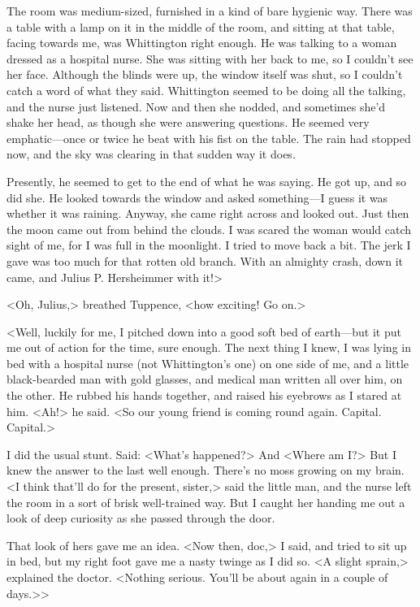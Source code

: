 The room was medium-sized, furnished in a kind of bare hygienic way. There was a table with a lamp on it in the middle of the room, and sitting at that table, facing towards me, was Whittington right enough. He was talking to a woman dressed as a hospital nurse. She was sitting with her back to me, so I couldn't see her face. Although the blinds were up, the window itself was shut, so I couldn't catch a word of what they said. Whittington seemed to be doing all the talking, and the nurse just listened. Now and then she nodded, and sometimes she'd shake her head, as though she were answering questions. He seemed very emphatic—once or twice he beat with his fist on the table. The rain had stopped now, and the sky was clearing in that sudden way it does.

Presently, he seemed to get to the end of what he was saying. He got up, and so did she. He looked towards the window and asked something—I guess it was whether it was raining. Anyway, she came right across and looked out. Just then the moon came out from behind the clouds. I was scared the woman would catch sight of me, for I was full in the moonlight. I tried to move back a bit. The jerk I gave was too much for that rotten old branch. With an almighty crash, down it came, and Julius P. Hersheimmer with it!>

<Oh, Julius,> breathed Tuppence, <how exciting! Go on.>

<Well, luckily for me, I pitched down into a good soft bed of earth—but it put me out of action for the time, sure enough. The next thing I knew, I was lying in bed with a hospital nurse (not Whittington's one) on one side of me, and a little black-bearded man with gold glasses, and medical man written all over him, on the other. He rubbed his hands together, and raised his eyebrows as I stared at him. <Ah!> he said. <So our young friend is coming round again. Capital. Capital.>

I did the usual stunt. Said: <What's happened?> And <Where am I?> But I knew the answer to the last well enough. There's no moss growing on my brain. <I think that'll do for the present, sister,> said the little man, and the nurse left the room in a sort of brisk well-trained way. But I caught her handing me out a look of deep curiosity as she passed through the door.

That look of hers gave me an idea. <Now then, doc,> I said, and tried to sit up in bed, but my right foot gave me a nasty twinge as I did so. <A slight sprain,> explained the doctor. <Nothing serious. You'll be about again in a couple of days.>>

